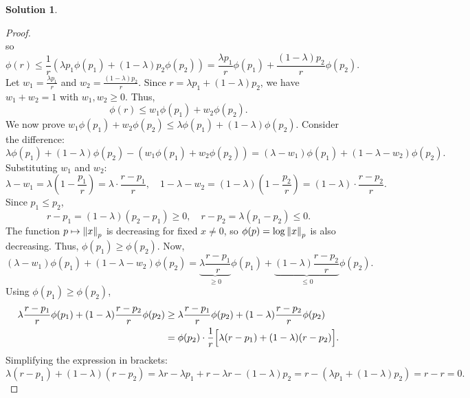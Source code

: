 \documentclass[12pt]{article}
\theoremstyle{definition}
\newtheorem*{solution}{\normalfont\textbf{Solution}}
\begin{document}
\begin{enumerate}[leftmargin=*]
\begin{solution}
\begin{proof}
\[                \]
                so
                \[
                \phi(r) \leq \frac{1}{r} \left( \lambda p_1 \phi(p_1) + (1-\lambda) p_2 \phi(p_2) \right) = \frac{\lambda p_1}{r} \phi(p_1) + \frac{(1-\lambda) p_2}{r} \phi(p_2).
                \]
                Let \( w_1 = \frac{\lambda p_1}{r} \) and \( w_2 = \frac{(1-\lambda) p_2}{r} \). Since \( r = \lambda p_1 + (1-\lambda)p_2 \), we have \( w_1 + w_2 = 1 \) with \( w_1, w_2 \geq 0 \). Thus,
                \[
                \phi(r) \leq w_1 \phi(p_1) + w_2 \phi(p_2).
                \]
                We now prove \( w_1 \phi(p_1) + w_2 \phi(p_2) \leq \lambda \phi(p_1) + (1-\lambda) \phi(p_2) \). Consider the difference:
                \[
                \lambda \phi(p_1) + (1-\lambda) \phi(p_2) - \left( w_1 \phi(p_1) + w_2 \phi(p_2) \right) = (\lambda - w_1) \phi(p_1) + (1-\lambda - w_2) \phi(p_2).
                \]
                Substituting \( w_1 \) and \( w_2 \):
                \[
                \lambda - w_1 = \lambda \left(1 - \frac{p_1}{r}\right) = \lambda \cdot \frac{r - p_1}{r}, \quad 
                1-\lambda - w_2 = (1-\lambda) \left(1 - \frac{p_2}{r}\right) = (1-\lambda) \cdot \frac{r - p_2}{r}.
                \]
                Since \( p_1 \leq p_2 \),
                \[
                r - p_1 = (1-\lambda)(p_2 - p_1) \geq 0, \quad r - p_2 = \lambda (p_1 - p_2) \leq 0.
                \]
                The function \( p \mapsto \norm{x}_p \) is decreasing for fixed \( x \neq 0 \), so \( \phi(p) = \log \norm{x}_p \) is also decreasing. Thus, \( \phi(p_1) \geq \phi(p_2) \). Now,
                \[
                (\lambda - w_1) \phi(p_1) + (1-\lambda - w_2) \phi(p_2) = \underbrace{\lambda \frac{r - p_1}{r}}_{\geq 0} \phi(p_1) + \underbrace{(1-\lambda) \frac{r - p_2}{r}}_{\leq 0} \phi(p_2).
                \]
                Using \( \phi(p_1) \geq \phi(p_2) \),
                \begin{align*}
                \lambda \frac{r - p_1}{r} \phi(p_1) + (1-\lambda) \frac{r - p_2}{r} \phi(p_2) 
                &\geq \lambda \frac{r - p_1}{r} \phi(p_2) + (1-\lambda) \frac{r - p_2}{r} \phi(p_2)\\
                &= \phi(p_2) \cdot \frac{1}{r} \Bigl[ \lambda (r - p_1) + (1-\lambda) (r - p_2) \Bigr].
                \end{align*}
                Simplifying the expression in brackets:
                \[
                \lambda (r - p_1) + (1-\lambda) (r - p_2) = \lambda r - \lambda p_1 + r - \lambda r - (1-\lambda) p_2 = r - (\lambda p_1 + (1-\lambda) p_2) = r - r = 0.
\]
\end{proof}
\end{solution}
\end{enumerate}
\end{document}
